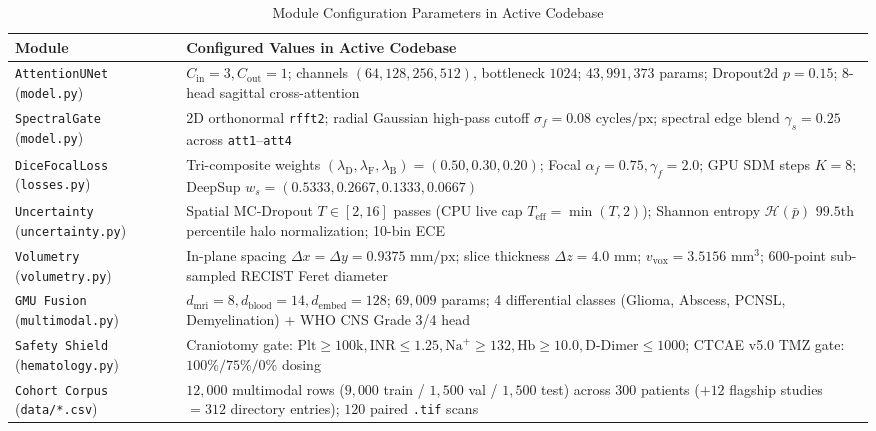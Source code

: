 \documentclass[conference]{IEEEtran}
\begin{document}
\begin{table}[t]
\centering
\caption{Module Configuration Parameters in Active Codebase}
\label{tab:config}
\begin{tabular}{@{}L{1.95cm}L{6.25cm}@{}}
\toprule
\textbf{Module} & \textbf{Configured Values in Active Codebase} \\
\midrule
\texttt{AttentionUNet} (\texttt{model.py}) & $C_{\text{in}}=3, C_{\text{out}}=1$; channels $(64,128,256,512)$, bottleneck $1024$; $43,991,373$ params; $\text{Dropout2d } p=0.15$; 8-head sagittal cross-attention \\
\texttt{SpectralGate} (\texttt{model.py}) & 2D orthonormal \texttt{rfft2}; radial Gaussian high-pass cutoff $\sigma_f = 0.08\text{ cycles/px}$; spectral edge blend $\gamma_s = 0.25$ across \texttt{att1}--\texttt{att4} \\
\texttt{DiceFocalLoss} (\texttt{losses.py}) & Tri-composite weights $(\lambda_{\text{D}}, \lambda_{\text{F}}, \lambda_{\text{B}}) = (0.50, 0.30, 0.20)$; Focal $\alpha_f = 0.75, \gamma_f = 2.0$; GPU SDM steps $K = 8$; DeepSup $w_s = (0.5333, 0.2667, 0.1333, 0.0667)$ \\
\texttt{Uncertainty} (\texttt{uncertainty.py}) & Spatial MC-Dropout $T \in [2, 16]$ passes (CPU live cap $T_{\text{eff}} = \min(T, 2)$); Shannon entropy $\mathcal{H}(\bar{p})$ $99.5\text{th}$ percentile halo normalization; 10-bin ECE \\
\texttt{Volumetry} (\texttt{volumetry.py}) & In-plane spacing $\Delta x = \Delta y = 0.9375\text{ mm/px}$; slice thickness $\Delta z = 4.0\text{ mm}$; $v_{\text{vox}} = 3.5156\text{ mm}^3$; 600-point sub-sampled RECIST Feret diameter \\
\texttt{GMU Fusion} (\texttt{multimodal.py}) & $d_{\text{mri}}=8, d_{\text{blood}}=14, d_{\text{embed}}=128$; $69,009$ params; 4 differential classes (Glioma, Abscess, PCNSL, Demyelination) + WHO CNS Grade 3/4 head \\
\texttt{Safety Shield} (\texttt{hematology.py}) & Craniotomy gate: $\text{Plt} \ge 100\text{k}, \text{INR} \le 1.25, \text{Na}^+ \ge 132, \text{Hb} \ge 10.0, \text{D-Dimer} \le 1000$; CTCAE v5.0 TMZ gate: $100\% / 75\% / 0\%$ dosing \\
\texttt{Cohort Corpus} (\texttt{data/*.csv}) & $12,000$ multimodal rows ($9,000$ train / $1,500$ val / $1,500$ test) across $300$ patients ($+12$ flagship studies $= 312$ directory entries); $120$ paired \texttt{.tif} scans \\
\bottomrule
\end{tabular}
\end{table}
\end{document}
